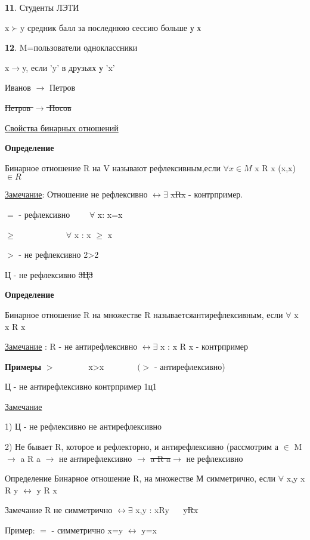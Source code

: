 \documentclass{article}
\begin{document}
    \textbf{11}. Студенты ЛЭТИ
    
    x$\succ$y средник балл за последнюю сессию больше у х
    
    \textbf{12}. M=пользователи одноклассники
    
    x$\rightarrow$y, если 'y' в друзьях у 'x'
    
    Иванов $\rightarrow$ Петров
    
    \sout{Петров $\rightarrow$ Посов}
    
    \underline{Свойства бинарных отношений}
    
    \textbf{Определение}
    
    Бинарное отношение R на V называют рефлексивным,если $\forall x\in M$ \quad x R x (x,x)$\in R$
    
    
    \underline{Замечание}: Отношение не рефлексивно $\leftrightarrow \exists$ \sout{xRx} - контрпример.
    
    $=$ - рефлексивно $\qquad \forall$ x: x=x
    
    $\geq \qquad \qquad \qquad \forall$ x : x $\geq$ x
    
    $>$ - не рефлексивно 2>2
    
    Ц - не рефлексивно \sout{3Ц3}
    
    \textbf{Определение}
    
    Бинарное отношение R на множестве R называетсяантирефлексивным,
    если $\forall$ x x R x
    
    \underline{Замечание} : R - не антирефлексивно $\leftrightarrow \exists$ x : x R x - контрпример
    
    \textbf{Примеры} $> \qquad \qquad $x>x$ \qquad \qquad (>$ - антирефлексивно)
    
    Ц - не антирефлексивно контрпример 1ц1
    
    \underline{Замечание}
    
    1) Ц - не рефлексивно \qquad \qquad не антирефлексивно
    
    2) Не бывает R, которое и рефлекторно, и антирефлексивно (рассмотрим а $\in$ M $\rightarrow$ a R a $\rightarrow$ не антирефлексивно $\rightarrow $ \sout{a R a}$  \rightarrow$ не рефлексивно
    
    Определение Бинарное отношение R, на множестве М симметрично, если $\forall$ x,y x R y $\leftrightarrow$ y R x
    
    Замечание R не симметрично $\leftrightarrow \exists$ x,y : xRy $\quad$ \sout{yRx}
    
    Пример: $=$ - симметрично x=y $\leftrightarrow$ y=x
    
\end{document}
